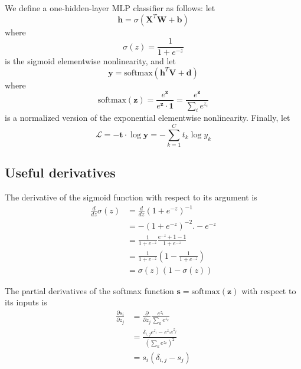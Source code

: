\documentclass{article}
\begin{document}
We define a one-hidden-layer MLP classifier as follows: let
\begin{equation}
    \mathbf{h} = \sigma(\mathbf{X}^T\mathbf{W} + \mathbf{b})
\end{equation}
where
\begin{equation}
    \sigma(z) = \frac{1}{1 + e^{-z}}
\end{equation}
is the sigmoid elementwise nonlinearity, and let
\begin{equation}
    \mathbf{y} = \textrm{softmax}(\mathbf{h}^T\mathbf{V} + \mathbf{d})
\end{equation}
where
\begin{equation}
    \textrm{softmax}(\mathbf{z})
    = \frac{e^{\mathbf{z}}}{e^{\mathbf{z}} \cdot \mathbf{1}}
    = \frac{e^{\mathbf{z}}}{\sum_i e^{z_i}}
\end{equation}
is a normalized version of the exponential elementwise nonlinearity. Finally,
let
\begin{equation}
    \mathcal{L}
    = -\mathbf{t} \cdot \log \mathbf{y}
    = - \sum_{k=1}^C t_k \log y_k
\end{equation}

\subsection*{Useful derivatives}

The derivative of the sigmoid function with respect to its argument is
\begin{equation}
\begin{split}
    \frac{d}{dz}\sigma(z)
    &= \frac{d}{dz}(1 + e^{-z})^{-1} \\
    &= -(1 + e^{-z})^{-2} . -e^{-z} \\
    &= \frac{1}{1 + e^{-z}} \frac{e^{-z} + 1 - 1}{1 + e^{-z}} \\
    &= \frac{1}{1 + e^{-z}} \left(1 - \frac{1}{1 + e^{-z}}\right) \\
    &= \sigma(z)(1 - \sigma(z))
\end{split}
\end{equation}

The partial derivatives of the softmax function
$\mathbf{s} = \textrm{softmax}(\mathbf{z})$ with respect to its inputs is
\begin{equation}
\begin{split}
    \frac{\partial s_i}{\partial z_j}
    &= \frac{\partial}{\partial z_j} \frac{e^{z_i}}{\sum_k e^{z_k}} \\
    &= \frac{\delta_{i,j} e^{z_i} - e^{z_i}e^{z_j}}
            {\left(\sum_k e^{z_k}\right)^2} \\
    &=  s_i (\delta_{i,j} - s_j) \\
\end{split}
\end{equation}
\end{document}
